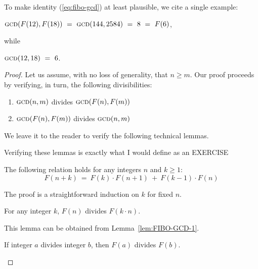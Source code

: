\noindent
To make identity (\ref{eq:fibo-gcd}) at least plausible, we cite a single example:

\hspace*{.35in}
$\mbox{\sc gcd}(F(12), F(18)) 
   \ = \ \mbox{\sc gcd}(144,2584)
   \ = \ 8 \ = \ F(6)$,

\noindent while

\hspace*{.35in}
$\mbox{\sc gcd}(12,18) \ = \ 6$.

\medskip

\begin{proof}
Let us assume, with no loss of generality,  that $n \geq m$.  Our proof proceeds by verifying, in turn, the following divisibilities:
\begin{enumerate}
\item
$\mbox{\sc gcd}(n,m)$ divides $\mbox{\sc gcd}(F(n), F(m))$

\item
$\mbox{\sc gcd}(F(n), F(m))$ divides $\mbox{\sc gcd}(n,m)$
\end{enumerate}

\smallskip

\noindent
We leave it to the reader to verify the following technical lemmas.

{\Arny Verifying these lemmas is exactly what I would define as an EXERCISE}

\begin{lemma}
\label{lem:FIBO-GCD-1}
The following relation holds for any integers $n$ and $k \geq 1$:
\[  F(n+k) \ = \ F(k) \cdot F(n+1) \ + \ F(k-1) \cdot F(n) \] 
\end{lemma}

\noindent
The proof is a straightforward induction on $k$ for fixed $n$.


\begin{lemma}
\label{lem:FIBO-GCD-2}
For any integer $k$, $F(n)$ divides $F(k \cdot n)$.
\end{lemma}

\noindent
This lemma can be obtained from Lemma~\ref{lem:FIBO-GCD-1}.

\begin{lemma}
\label{lem:FIBO-GCD-3}
If integer $a$ divides integer $b$, then $F(a)$ divides $F(b)$.
\end{lemma}


\end{proof}
